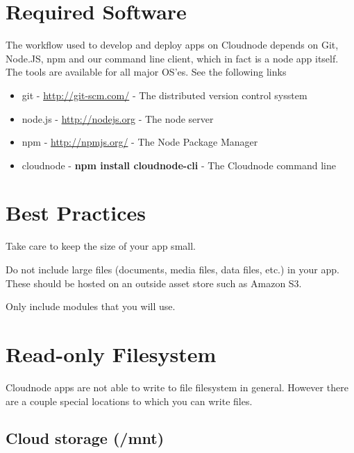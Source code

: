 \section{Required Software}
\label{requiredsoftware}

The workflow used to develop and deploy apps on Cloudnode depends on Git, Node.JS, npm and our command line client, which in fact is a node app itself. The tools are available for all major OS'es. See the following links

\begin{itemize}
\item git - \href{http://git-scm.com/}{http:/\slash git-scm.com\slash } - The distributed version control sysstem

\item node.js - \href{http://nodejs.org}{http:/\slash nodejs.org} - The node server

\item npm - \href{http://npmjs.org/}{http:/\slash npmjs.org\slash } - The Node Package Manager

\item cloudnode - \textbf{npm install cloudnode-cli} - The Cloudnode command line

\end{itemize}



\section{Best Practices}
\label{bestpractices}

Take care to keep the size of your app small.

Do not include large files (documents, media files, data files, etc.) in your app. These should be hosted on an outside asset store such as Amazon S3.

Only include modules that you will use.



\section{Read-only Filesystem}
\label{read-onlyfilesystem}

Cloudnode apps are not able to write to file filesystem in general. However there are a couple special locations to which you can write files.

\subsection{Cloud storage (\slash mnt)}
\label{cloudstoragemnt}

